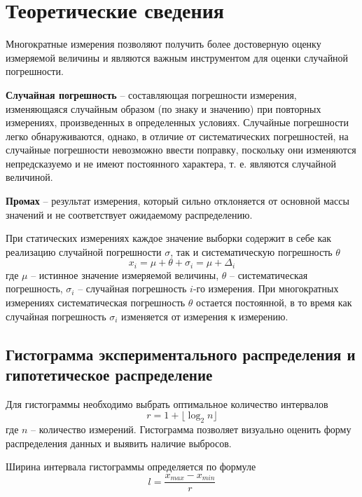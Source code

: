 \documentclass[12pt,a4paper]{article}
\begin{document}
\section{Теоретические сведения}

Многократные измерения позволяют получить более достоверную
оценку измеряемой величины и являются важным инструментом для
оценки случайной погрешности.

\textbf{Случайная погрешность} – составляющая погрешности измерения,
изменяющаяся случайным образом (по знаку и значению) при повторных измерениях, 
произведенных в определенных условиях. Случайные
погрешности легко обнаруживаются, однако, в отличие от систематических 
погрешностей, на случайные погрешности невозможно ввести поправку, 
поскольку они изменяются непредсказуемо и не имеют постоянного характера, 
т. е. являются случайной величиной.

\textbf{Промах} – результат измерения, который сильно отклоняется от основной массы значений 
и не соответствует ожидаемому распределению.

При статических измерениях каждое значение выборки содержит в
себе как реализацию случайной погрешности $\sigma$, так и систематическую
погрешность $\theta$
\begin{equation}
x_i = \mu + \theta + \sigma_i = \mu + \Delta_i
\tag{0.1}
\end{equation}
где $\mu$ – истинное значение измеряемой величины, $\theta$ – систематическая 
погрешность, $\sigma_i$ – случайная погрешность $i$-го измерения. При многократных 
измерениях систематическая погрешность $\theta$ остается постоянной, в то время как 
случайная погрешность $\sigma_i$ изменяется от измерения к измерению.

\subsection{Гистограмма экспериментального распределения и гипотетическое распределение}

Для гистограммы необходимо выбрать оптимальное количество интервалов
\begin{equation}
r = 1 + \lfloor \log_2 n \rfloor
\tag{1.1}
\label{gistogram:r}
\end{equation}
где $n$ – количество измерений. Гистограмма позволяет визуально оценить форму
распределения данных и выявить наличие выбросов.

Ширина интервала гистограммы определяется по формуле
\begin{equation*}
l = \frac{x_{max} - x_{min}}{r}
\end{equation*}
\end{document}
